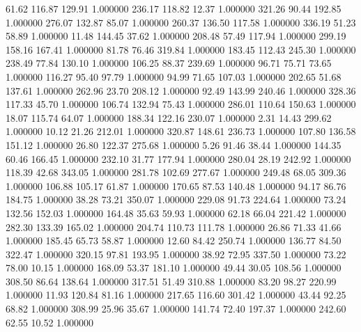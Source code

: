      61.62    116.87    129.91  1.000000
    236.17    118.82     12.37  1.000000
    321.26     90.44    192.85  1.000000
    276.07    132.87     85.07  1.000000
    260.37    136.50    117.58  1.000000
    336.19     51.23     58.89  1.000000
     11.48    144.45     37.62  1.000000
    208.48     57.49    117.94  1.000000
    299.19    158.16    167.41  1.000000
     81.78     76.46    319.84  1.000000
    183.45    112.43    245.30  1.000000
    238.49     77.84    130.10  1.000000
    106.25     88.37    239.69  1.000000
     96.71     75.71     73.65  1.000000
    116.27     95.40     97.79  1.000000
     94.99     71.65    107.03  1.000000
    202.65     51.68    137.61  1.000000
    262.96     23.70    208.12  1.000000
     92.49    143.99    240.46  1.000000
    328.36    117.33     45.70  1.000000
    106.74    132.94     75.43  1.000000
    286.01    110.64    150.63  1.000000
     18.07    115.74     64.07  1.000000
    188.34    122.16    230.07  1.000000
      2.31     14.43    299.62  1.000000
     10.12     21.26    212.01  1.000000
    320.87    148.61    236.73  1.000000
    107.80    136.58    151.12  1.000000
     26.80    122.37    275.68  1.000000
      5.26     91.46     38.44  1.000000
    144.35     60.46    166.45  1.000000
    232.10     31.77    177.94  1.000000
    280.04     28.19    242.92  1.000000
    118.39     42.68    343.05  1.000000
    281.78    102.69    277.67  1.000000
    249.48     68.05    309.36  1.000000
    106.88    105.17     61.87  1.000000
    170.65     87.53    140.48  1.000000
     94.17     86.76    184.75  1.000000
     38.28     73.21    350.07  1.000000
    229.08     91.73    224.64  1.000000
     73.24    132.56    152.03  1.000000
    164.48     35.63     59.93  1.000000
     62.18     66.04    221.42  1.000000
    282.30    133.39    165.02  1.000000
    204.74    110.73    111.78  1.000000
     26.86     71.33     41.66  1.000000
    185.45     65.73     58.87  1.000000
     12.60     84.42    250.74  1.000000
    136.77     84.50    322.47  1.000000
    320.15     97.81    193.95  1.000000
     38.92     72.95    337.50  1.000000
     73.22     78.00     10.15  1.000000
    168.09     53.37    181.10  1.000000
     49.44     30.05    108.56  1.000000
    308.50     86.64    138.64  1.000000
    317.51     51.49    310.88  1.000000
     83.20     98.27    220.99  1.000000
     11.93    120.84     81.16  1.000000
    217.65    116.60    301.42  1.000000
     43.44     92.25     68.82  1.000000
    308.99     25.96     35.67  1.000000
    141.74     72.40    197.37  1.000000
    242.60     62.55     10.52  1.000000
